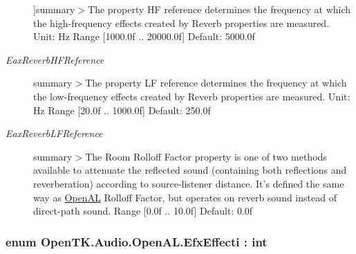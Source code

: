 \begin{Desc}
\begin{description}
{}]summary$>$The property H\-F reference determines the frequency at which the high-\/frequency effects created by Reverb properties are measured. Unit\-: Hz Range \mbox{[}1000.\-0f .. 20000.\-0f\mbox{]} Default\-: 5000.\-0f\item[{\em 
\hypertarget{namespace_open_t_k_1_1_audio_1_1_open_a_l_aa0356299908369b4365d28572c0ec20ba7e193e20ced30dfd6891b56184ac6fd8}{Eax\-Reverb\-H\-F\-Reference}\label{namespace_open_t_k_1_1_audio_1_1_open_a_l_aa0356299908369b4365d28572c0ec20ba7e193e20ced30dfd6891b56184ac6fd8}
}]summary$>$The property L\-F reference determines the frequency at which the low-\/frequency effects created by Reverb properties are measured. Unit\-: Hz Range \mbox{[}20.\-0f .. 1000.\-0f\mbox{]} Default\-: 250.\-0f\item[{\em 
\hypertarget{namespace_open_t_k_1_1_audio_1_1_open_a_l_aa0356299908369b4365d28572c0ec20bad8e694171d1a74dad6e9a8bc6d56e7b1}{Eax\-Reverb\-L\-F\-Reference}\label{namespace_open_t_k_1_1_audio_1_1_open_a_l_aa0356299908369b4365d28572c0ec20bad8e694171d1a74dad6e9a8bc6d56e7b1}
}]summary$>$The Room Rolloff Factor property is one of two methods available to attenuate the reflected sound (containing both reflections and reverberation) according to source-\/listener distance. It's defined the same way as \hyperlink{namespace_open_t_k_1_1_audio_1_1_open_a_l}{Open\-A\-L} Rolloff Factor, but operates on reverb sound instead of direct-\/path sound. Range \mbox{[}0.\-0f .. 10.\-0f\mbox{]} Default\-: 0.\-0f\end{description}
\end{Desc}
\hypertarget{namespace_open_t_k_1_1_audio_1_1_open_a_l_a49039c1ddcb53675576ad2780fc50315}{
\subsubsection[{Efx\-Effecti}]{\setlength{\rightskip}{0pt plus 5cm}enum {\bf Open\-T\-K.\-Audio.\-Open\-A\-L.\-Efx\-Effecti} \-: int}}\label{namespace_open_t_k_1_1_audio_1_1_open_a_l_a49039c1ddcb53675576ad2780fc50315}


